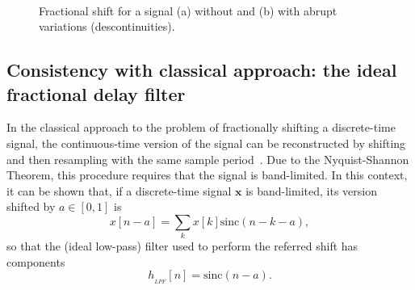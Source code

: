 \begin{figure}[t!]
	\centering
	\\
	\caption{Fractional shift for a signal (a) without and (b) with abrupt variations (descontinuities).}%
	\label{fig:frac_delay_gibbs}%
	\vspace{-0.2cm}
\end{figure}

\subsection{Consistency with classical approach: the ideal fractional delay filter}\label{subsec:consist}
In the classical approach to the problem of fractionally shifting a discrete-time signal, the continuous-time version of the signal can be reconstructed by shifting and then resampling with the same sample period~\cite{alan1989discrete,valimaki1995discrete}. Due to the Nyquist-Shannon Theorem, this procedure requires that the signal is band-limited. In this context, it can be shown that, if a discrete-time signal $ \mathbf{x} $ is band-limited, its version shifted by $ a \in [0,1] $ is
$$
x[n-a] = \sum_k x[k] \mathrm{sinc} (n - k - a),
$$
so that the (ideal low-pass) filter used to perform the referred shift has components
\begin{equation}
h_{_{LPF}}[n] = \mathrm{sinc} (n-a).
\end{equation}

